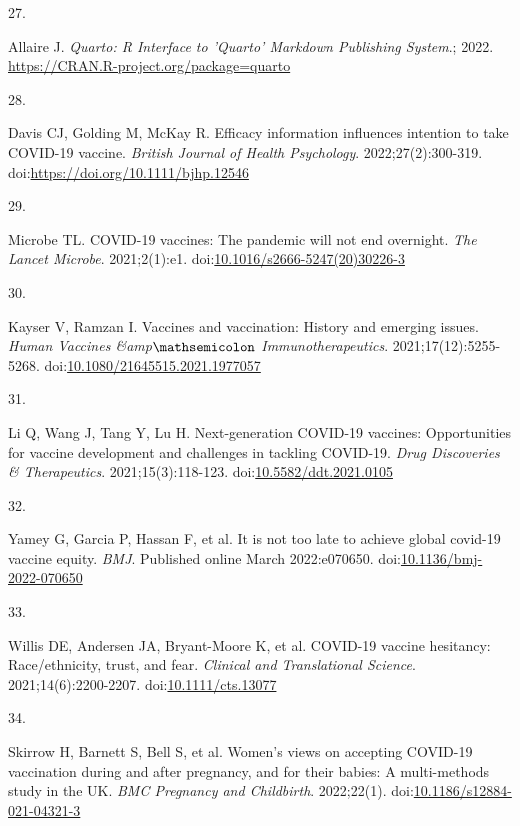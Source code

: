 \documentclass[
  letterpaper,
  DIV=11,
  numbers=noendperiod]{scrartcl}
\newlength{\cslhangindent}
\newlength{\csllabelwidth}
\newlength{\cslentryspacingunit} %
\newenvironment{CSLReferences}[2] %
 {%
  \setlength{\parindent}{0pt}
  \ifodd #1
  \let\oldpar\par
  \def\par{\hangindent=\cslhangindent\oldpar}
  \fi
  \setlength{\parskip}{#2\cslentryspacingunit}
 }%
 {}
\newcommand{\CSLLeftMargin}[1]{\parbox[t]{\csllabelwidth}{#1}}
\newcommand{\CSLRightInline}[1]{\parbox[t]{\linewidth - \csllabelwidth}{#1}\break}
\begin{document}
\begin{CSLReferences}{0}{0}
\leavevmode{}%
\CSLLeftMargin{27. }%
\CSLRightInline{Allaire J. \emph{Quarto: R Interface to 'Quarto'
Markdown Publishing System}.; 2022.
\url{https://CRAN.R-project.org/package=quarto}}

\leavevmode{}%
\CSLLeftMargin{28. }%
\CSLRightInline{Davis CJ, Golding M, McKay R. Efficacy information
influences intention to take COVID-19 vaccine. \emph{British Journal of
Health Psychology}. 2022;27(2):300-319.
doi:\url{https://doi.org/10.1111/bjhp.12546}}

\leavevmode{}%
\CSLLeftMargin{29. }%
\CSLRightInline{Microbe TL. {COVID}-19 vaccines: The pandemic will not
end overnight. \emph{The Lancet Microbe}. 2021;2(1):e1.
doi:\href{https://doi.org/10.1016/s2666-5247(20)30226-3}{10.1016/s2666-5247(20)30226-3}}

\leavevmode{}%
\CSLLeftMargin{30. }%
\CSLRightInline{Kayser V, Ramzan I. Vaccines and vaccination: History
and emerging issues. \emph{Human Vaccines {\&}amp\(\mathsemicolon\)
Immunotherapeutics}. 2021;17(12):5255-5268.
doi:\href{https://doi.org/10.1080/21645515.2021.1977057}{10.1080/21645515.2021.1977057}}

\leavevmode{}%
\CSLLeftMargin{31. }%
\CSLRightInline{Li Q, Wang J, Tang Y, Lu H. Next-generation COVID-19
vaccines: Opportunities for vaccine development and challenges in
tackling COVID-19. \emph{Drug Discoveries \& Therapeutics}.
2021;15(3):118-123.
doi:\href{https://doi.org/10.5582/ddt.2021.0105}{10.5582/ddt.2021.0105}}

\leavevmode{}%
\CSLLeftMargin{32. }%
\CSLRightInline{Yamey G, Garcia P, Hassan F, et al. It is not too late
to achieve global covid-19 vaccine equity. \emph{{BMJ}}. Published
online March 2022:e070650.
doi:\href{https://doi.org/10.1136/bmj-2022-070650}{10.1136/bmj-2022-070650}}

\leavevmode{}%
\CSLLeftMargin{33. }%
\CSLRightInline{Willis DE, Andersen JA, Bryant-Moore K, et al.
{COVID}-19 vaccine hesitancy: Race/ethnicity, trust, and fear.
\emph{Clinical and Translational Science}. 2021;14(6):2200-2207.
doi:\href{https://doi.org/10.1111/cts.13077}{10.1111/cts.13077}}

\leavevmode{}%
\CSLLeftMargin{34. }%
\CSLRightInline{Skirrow H, Barnett S, Bell S, et al. Women's views on
accepting {COVID}-19 vaccination during and after pregnancy, and for
their babies: A multi-methods study in the {UK}. \emph{{BMC} Pregnancy
and Childbirth}. 2022;22(1).
doi:\href{https://doi.org/10.1186/s12884-021-04321-3}{10.1186/s12884-021-04321-3}}


\end{CSLReferences}
\end{document}
